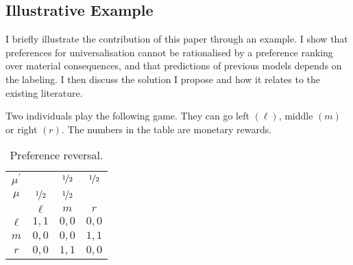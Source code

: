 \subsection{Illustrative Example}\label{sec:exampleuniv}

I briefly illustrate the contribution of this paper through an example. I show that preferences for universalisation cannot be rationalised by a preference ranking over material consequences, and that predictions of previous models depends on the labeling. I then discuss the solution I propose and how it relates to the existing literature.

Two individuals play the following game. They can go left \( ( \ell ) \), middle \( ( m ) \) or right \( ( r ) \). The numbers in the table are monetary rewards.

\begin{table}[H]
	\begin{center}
		\begin{tabular}{c | c c c}
			\(\mu^{\prime}\) &                     & \(\nicefrac{1}{2}\) & \(\nicefrac{1}{2}\) \\
			\(\mu\)          & \(\nicefrac{1}{2}\) & \(\nicefrac{1}{2}\) &                     \\
			                 & \(\ell\)            & \(m\)               & \(r\)               \\
			\hline
			\(\ell\)         & \(1,1\)             & \(0,0\)             & \(0,0\)             \\
			\(m\)            & \(0,0\)             & \(0,0\)             & \(1,1\)             \\
			\(r\)            & \(0,0\)             & \(1,1\)             & \(0,0\)
		\end{tabular}
	\end{center}
	\caption{Preference reversal.}
	\label{tab:reversal}
\end{table}

